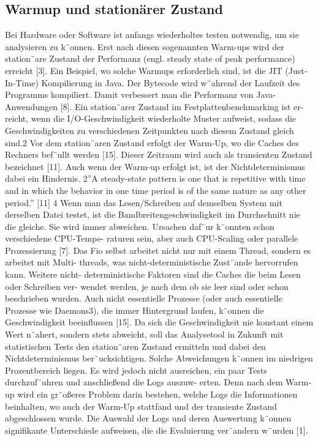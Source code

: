\subsection{Warmup und stationärer Zustand}
Bei Hardware oder Software ist anfangs wiederholtes testen notwendig, um
sie analysieren zu k¨onnen. Erst nach diesen sogenannten Warm-ups wird der
station¨are Zustand der Performanz (engl. steady state of peak performance)
erreicht [3]. Ein Beispiel, wo solche Warmups erforderlich sind, ist die JIT
(Just-In-Time) Kompilierung in Java. Der Bytecode wird w¨ahrend der Laufzeit
des Programms kompiliert. Damit verbessert man die Performanz von Java-
Anwendungen [8]. Ein station¨arer Zustand im Festplattenbenchmarking ist er-
reicht, wenn die I/O-Geschwindigkeit wiederholte Muster aufweist, sodass die
Geschwindigkeiten zu verschiedenen Zeitpunkten nach diesem Zustand gleich
sind.2 Vor dem station¨aren Zustand erfolgt der Warm-Up, wo die Caches des
Rechners bef¨ullt werden [15]. Dieser Zeitraum wird auch als transienten Zustand
bezeichnet [11]. Auch wenn der Warm-up erfolgt ist, ist der Nichtdeterminismus
dabei ein Hindernis.
2”A steady-state pattern is one that is repetitive with time and in which the behavior in
one time period is of the same nature as any other period.” [11]
4
Wenn man das Lesen/Schreiben auf demselben System mit derselben Datei
testet, ist die Bandbreitengeschwindigkeit im Durchschnitt nie die gleiche. Sie
wird immer abweichen. Ursachen daf¨ur k¨onnten schon verschiedene CPU-Tempe-
raturen sein, aber auch CPU-Scaling oder parallele Prozessierung [7]. Das Fio
selbst arbeitet nicht nur mit einem Thread, sondern es arbeitet mit Multi-
threads, was nicht-deterministische Zust¨ande hervorrufen kann. Weitere nicht-
deterministische Faktoren sind die Caches die beim Lesen oder Schreiben ver-
wendet werden, je nach dem ob sie leer sind oder schon beschrieben wurden.
Auch nicht essentielle Prozesse (oder auch essentielle Prozesse wie Daemons3),
die immer Hintergrund laufen, k¨onnen die Geschwindigkeit beeinflussen [15].
Da sich die Geschwindigkeit nie konstant einem Wert n¨ahert, sondern stets
abweicht, soll das Analysetool in Zukunft mit statistischen Tests den station¨aren
Zustand ermitteln und dabei den Nichtdeterminismus ber¨ucksichtigen. Solche
Abweichungen k¨onnen im niedrigen Prozentbereich liegen. Es wird jedoch nicht
ausreichen, ein paar Tests durchzuf¨uhren und anschließend die Logs auszuw-
erten. Denn nach dem Warm-up wird ein gr¨oßeres Problem darin bestehen,
welche Logs die Informationen beinhalten, wo auch der Warm-Up stattfand und
der transiente Zustand abgeschlossen wurde. Die Auswahl der Logs und deren
Auswertung k¨onnen signifikante Unterschiede aufweisen, die die Evaluierung
ver¨andern w¨urden [1].

